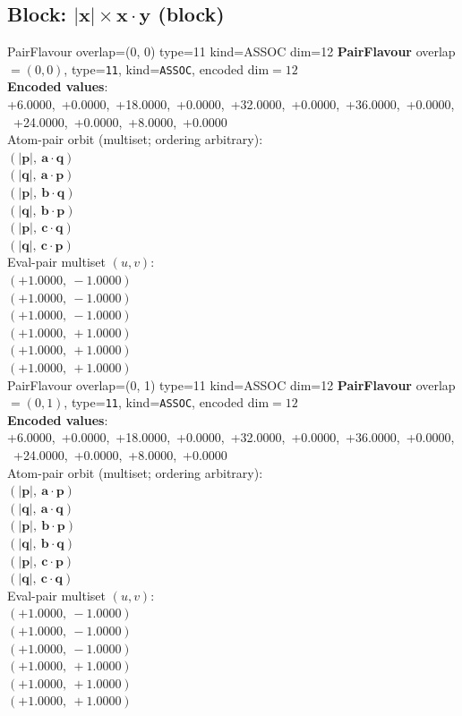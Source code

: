 \documentclass[a4paper,11pt]{article}
\newcommand{\vc}[1]{\ensuremath{\mathbf{#1}}}
\newcommand{\dnfagmiihhiejm}[1]{|\vc{#1}|}
\newcommand{\pdcegfomjfhook}[2]{\mathbf{#1} \cdot \mathbf{#2}}
\begin{document}
\subsection{Block: $\dnfagmiihhiejm{x} \times \pdcegfomjfhook{x}{y}$  (block)}
    PairFlavour  overlap=(0, 0)  type=11  kind=ASSOC  dim=12
\textbf{PairFlavour} overlap$=(0, 0)$, type=\texttt{11}, kind=\texttt{ASSOC}, encoded dim$=12$\\
\textbf{      Encoded values}: +6.0000,\ +0.0000,\ +18.0000,\ +0.0000,\ +32.0000,\ +0.0000,\ +36.0000,\ +0.0000,\ +24.0000,\ +0.0000,\ +8.0000,\ +0.0000\\
\quad Atom-pair orbit (multiset; ordering arbitrary):\\
$(\dnfagmiihhiejm{p},\ \pdcegfomjfhook{a}{q})$\\
$(\dnfagmiihhiejm{q},\ \pdcegfomjfhook{a}{p})$\\
$(\dnfagmiihhiejm{p},\ \pdcegfomjfhook{b}{q})$\\
$(\dnfagmiihhiejm{q},\ \pdcegfomjfhook{b}{p})$\\
$(\dnfagmiihhiejm{p},\ \pdcegfomjfhook{c}{q})$\\
$(\dnfagmiihhiejm{q},\ \pdcegfomjfhook{c}{p})$\\
\quad Eval-pair multiset $(u, v)$:\\
$(+1.0000,\ -1.0000)$\\
$(+1.0000,\ -1.0000)$\\
$(+1.0000,\ -1.0000)$\\
$(+1.0000,\ +1.0000)$\\
$(+1.0000,\ +1.0000)$\\
$(+1.0000,\ +1.0000)$\\
    PairFlavour  overlap=(0, 1)  type=11  kind=ASSOC  dim=12
\textbf{PairFlavour} overlap$=(0, 1)$, type=\texttt{11}, kind=\texttt{ASSOC}, encoded dim$=12$\\
\textbf{      Encoded values}: +6.0000,\ +0.0000,\ +18.0000,\ +0.0000,\ +32.0000,\ +0.0000,\ +36.0000,\ +0.0000,\ +24.0000,\ +0.0000,\ +8.0000,\ +0.0000\\
\quad Atom-pair orbit (multiset; ordering arbitrary):\\
$(\dnfagmiihhiejm{p},\ \pdcegfomjfhook{a}{p})$\\
$(\dnfagmiihhiejm{q},\ \pdcegfomjfhook{a}{q})$\\
$(\dnfagmiihhiejm{p},\ \pdcegfomjfhook{b}{p})$\\
$(\dnfagmiihhiejm{q},\ \pdcegfomjfhook{b}{q})$\\
$(\dnfagmiihhiejm{p},\ \pdcegfomjfhook{c}{p})$\\
$(\dnfagmiihhiejm{q},\ \pdcegfomjfhook{c}{q})$\\
\quad Eval-pair multiset $(u, v)$:\\
$(+1.0000,\ -1.0000)$\\
$(+1.0000,\ -1.0000)$\\
$(+1.0000,\ -1.0000)$\\
$(+1.0000,\ +1.0000)$\\
$(+1.0000,\ +1.0000)$\\
$(+1.0000,\ +1.0000)$\\
\end{document}

